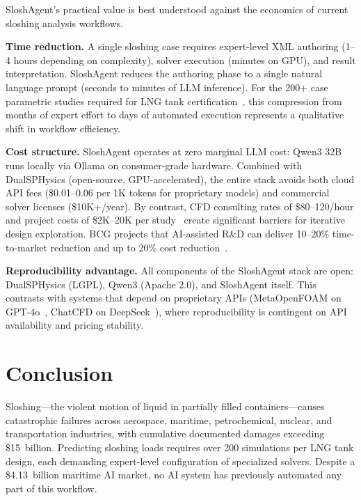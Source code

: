 \documentclass[11pt]{article}
\begin{document}
SloshAgent's practical value is best understood against the economics of current sloshing analysis workflows.

\textbf{Time reduction.} A single sloshing case requires expert-level XML authoring (1--4 hours depending on complexity), solver execution (minutes on GPU), and result interpretation. SloshAgent reduces the authoring phase to a single natural language prompt (seconds to minutes of LLM inference). For the 200+ case parametric studies required for LNG tank certification~\citep{isope2012sloshing}, this compression from months of expert effort to days of automated execution represents a qualitative shift in workflow efficiency.

\textbf{Cost structure.} SloshAgent operates at zero marginal LLM cost: Qwen3 32B runs locally via Ollama on consumer-grade hardware. Combined with DualSPHysics (open-source, GPU-accelerated), the entire stack avoids both cloud API fees (\$0.01--0.06 per 1K tokens for proprietary models) and commercial solver licenses (\$10K+/year). By contrast, CFD consulting rates of \$80--120/hour and project costs of \$2K--20K per study~\citep{cadcrowd2024} create significant barriers for iterative design exploration. BCG projects that AI-assisted R\&D can deliver 10--20\% time-to-market reduction and up to 20\% cost reduction~\citep{bcg2025}.

\textbf{Reproducibility advantage.} All components of the SloshAgent stack are open: DualSPHysics (LGPL), Qwen3 (Apache 2.0), and SloshAgent itself. This contrasts with systems that depend on proprietary APIs (MetaOpenFOAM on GPT-4o~\citep{metaopenfoam2024}, ChatCFD on DeepSeek~\citep{chatcfd2026}), where reproducibility is contingent on API availability and pricing stability.

\section{Conclusion}

Sloshing---the violent motion of liquid in partially filled containers---causes catastrophic failures across aerospace, maritime, petrochemical, nuclear, and transportation industries, with cumulative documented damages exceeding \$15~billion. Predicting sloshing loads requires over 200 simulations per LNG tank design, each demanding expert-level configuration of specialized solvers. Despite a \$4.13~billion maritime AI market, no AI system has previously automated any part of this workflow.
\end{document}
